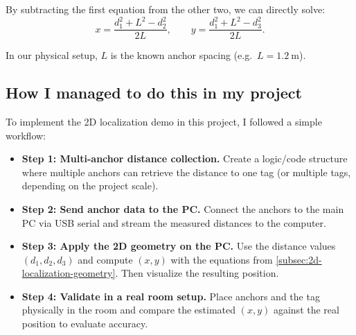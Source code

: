 \documentclass[a4paper,11pt]{article}
\begin{document}
By subtracting the first equation from the other two, we can directly solve:
\begin{equation}
	x = \frac{d_1^2 + L^2 - d_2^2}{2L},
	\qquad
	y = \frac{d_1^2 + L^2 - d_3^2}{2L}.
\end{equation}

In our physical setup, $L$ is the known anchor spacing (e.g.\ $L = 1.2~\text{m}$).

\subsection{How I managed to do this in my project}
\label{subsec:2d-localization-project-steps}

To implement the 2D localization demo in this project, I followed a simple workflow:

\begin{itemize}
	\item \textbf{Step 1: Multi-anchor distance collection.}
	Create a logic/code structure where multiple anchors can retrieve the distance to one tag
	(or multiple tags, depending on the project scale).
	
	\item \textbf{Step 2: Send anchor data to the PC.}
	Connect the anchors to the main PC via USB serial and stream the measured distances to the computer.
	
	\item \textbf{Step 3: Apply the 2D geometry on the PC.}
	Use the distance values $(d_1, d_2, d_3)$ and compute $(x,y)$ with the equations from
	\ref{subsec:2d-localization-geometry}. Then visualize the resulting position.
	
	\item \textbf{Step 4: Validate in a real room setup.}
	Place anchors and the tag physically in the room and compare the estimated $(x,y)$ against the
	real position to evaluate accuracy.
\end{itemize}


\end{document}
